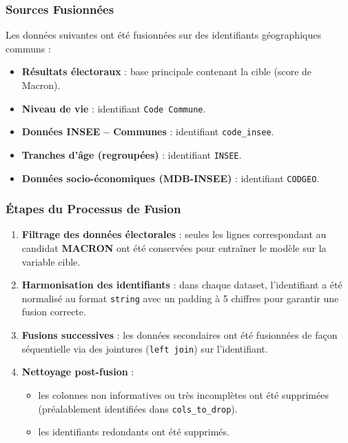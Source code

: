 \subsubsection*{Sources Fusionnées}

Les données suivantes ont été fusionnées sur des identifiants géographiques communs :

\begin{itemize}
  \item \textbf{Résultats électoraux} : base principale contenant la cible (score de Macron).
  \item \textbf{Niveau de vie} : identifiant \texttt{Code Commune}.
  \item \textbf{Données INSEE – Communes} : identifiant \texttt{code\_insee}.
  \item \textbf{Tranches d'âge (regroupées)} : identifiant \texttt{INSEE}.
  \item \textbf{Données socio-économiques (MDB-INSEE)} : identifiant \texttt{CODGEO}.
\end{itemize}


\subsubsection*{Étapes du Processus de Fusion}

\begin{enumerate}
  \item \textbf{Filtrage des données électorales} : seules les lignes correspondant au candidat \textbf{MACRON} ont été conservées pour entraîner le modèle sur la variable cible.
  
  \item \textbf{Harmonisation des identifiants} : dans chaque dataset, l'identifiant a été normalisé au format \texttt{string} avec un padding à 5 chiffres pour garantir une fusion correcte.

  \item \textbf{Fusions successives} : les données secondaires ont été fusionnées de façon séquentielle via des jointures (\texttt{left join}) sur l'identifiant.

  \item \textbf{Nettoyage post-fusion} :
  \begin{itemize}
    \item les colonnes non informatives ou très incomplètes ont été supprimées (préalablement identifiées dans \texttt{cols\_to\_drop}).
    \item les identifiants redondants ont été supprimés.
  \end{itemize}
\end{enumerate}
 
